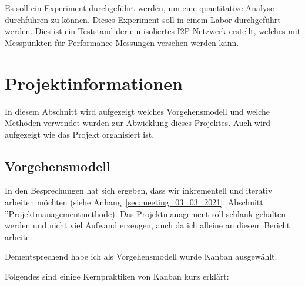 
Es soll ein Experiment durchgeführt werden, um eine quantitative Analyse durchführen zu können.
Dieses Experiment soll in einem Labor durchgeführt werden.
Dies ist ein Teststand der ein isoliertes I2P Netzwerk erstellt, welches mit Messpunkten für Performance-Messungen versehen werden kann.

\parencite{helmut_balzert_wissenschaftliches_nodate}



\section{Projektinformationen}\label{sec:projektinformationen}

In diesem Abschnitt wird aufgezeigt welches Vorgehensmodell und welche Methoden verwendet wurden zur Abwicklung dieses Projektes.
Auch wird aufgezeigt wie das Projekt organisiert ist.

\subsection{Vorgehensmodell}

 In den Besprechungen hat sich ergeben, dass wir inkrementell und iterativ arbeiten möchten
(siehe Anhang~\ref{sec:meeting_03_03_2021}, Abschnitt ''Projektmanagementmethode).
Das Projektmanagement soll schlank gehalten werden und nicht viel Aufwand erzeugen, auch da ich alleine an diesem Bericht arbeite.

Dementsprechend habe ich als Vorgehensmodell wurde Kanban ausgewählt.

Folgendes sind einige Kernpraktiken von Kanban kurz erklärt:


